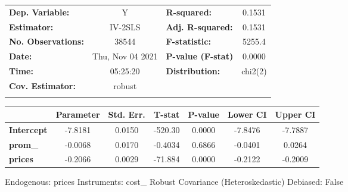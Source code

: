 \begin{center}
\begin{tabular}{lclc}
\toprule
\textbf{Dep. Variable:}    &         Y          & \textbf{  R-squared:         } &      0.1531      \\
\textbf{Estimator:}        &      IV-2SLS       & \textbf{  Adj. R-squared:    } &      0.1531      \\
\textbf{No. Observations:} &       38544        & \textbf{  F-statistic:       } &      5255.4      \\
\textbf{Date:}             &  Thu, Nov 04 2021  & \textbf{  P-value (F-stat)   } &      0.0000      \\
\textbf{Time:}             &      05:25:20      & \textbf{  Distribution:      } &     chi2(2)      \\
\textbf{Cov. Estimator:}   &       robust       & \textbf{                     } &                  \\
\textbf{}                  &                    & \textbf{                     } &                  \\
\bottomrule
\end{tabular}
\begin{tabular}{lcccccc}
                   & \textbf{Parameter} & \textbf{Std. Err.} & \textbf{T-stat} & \textbf{P-value} & \textbf{Lower CI} & \textbf{Upper CI}  \\
\midrule
\textbf{Intercept} &      -7.8181       &       0.0150       &     -520.30     &      0.0000      &      -7.8476      &      -7.7887       \\
\textbf{prom\_}    &      -0.0068       &       0.0170       &     -0.4034     &      0.6866      &      -0.0401      &       0.0264       \\
\textbf{prices}    &      -0.2066       &       0.0029       &     -71.884     &      0.0000      &      -0.2122      &      -0.2009       \\
\bottomrule
\end{tabular}
\end{center}

Endogenous: prices \newline
 Instruments: cost\_ \newline
 Robust Covariance (Heteroskedastic) \newline
 Debiased: False
